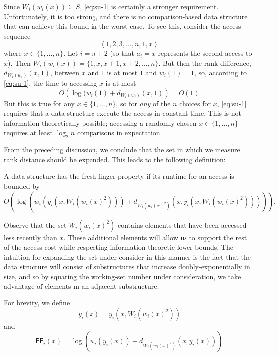 \documentclass{llncs}
\newcommand{\BigOh}[1]{O\!\left(#1\right)}
\newcommand{\SU}[1]{\textsf{FF}_i\!\left(#1\right)}
\begin{document}
Since $W_i(w_i(x))\subseteq S$, \eqref{eq:su-1} is certainly a stronger requirement.  Unfortunately, it is too strong, and there is no comparison-based data structure that can achieve this bound in the worst-case. To see this, consider the access sequence
\begin{displaymath}
	\left\langle 1,2,3,\ldots,n,1,x \right\rangle
\end{displaymath}
where $x \in \{1,\ldots,n\}$.  Let $i={n+2}$ (so that $a_i =x$ represents the second access to $x$).  Then $W_i(w_i(x)) = \{1,x,x+1,x+2,\ldots,n\}$.  But then the rank difference, $d_{W_i(w_i)}(x,1)$, between $x$ and $1$ is at most 1 and $w_i(1)=1$, so, according to \eqref{eq:su-1}, the time to accessing $x$ is at most\[
   \BigOh{\log(w_i(1)+d_{W_i(w_i)}(x,1)} = \BigOh{1}
\]
But this is true for any $x\in\{1,\ldots,n\}$, so for \emph{any} of the $n$ choices for $x$, \eqref{eq:su-1} requires that a data structure execute the access in constant time. This is not information-theoretically possible; accessing a randomly chosen $x\in\{1,\ldots,n\}$ requires at least $\log_2 n$ comparisons in expectation.  

From the preceding discussion, we conclude that the set in which we measure rank distance should be expanded.  This leads to the following definition:

\begin{definition} A data structure has the fresh-finger property if its runtime for an access is bounded by
\begin{displaymath}
	\BigOh{\log (w_i(y_i(x,W_i(w_i(x)^2))) + d_{W_i(w_i(x)^2)}(x,y_i(x,W_i(w_i(x)^2))))}.
\end{displaymath}
\end{definition}

Observe that the set $W_i(w_i(x)^2)$ contains elements that have been accessed less recently than $x$. These additional elements will allow us to support the rest of the access cost while respecting information-theoretic lower bounds. The intuition for expanding the set under consider in this manner is the fact that the data structure will consist of substructures that increase doubly-exponentially in size, and so by squaring the working-set number under consideration, we take advantage of elements in an adjacent substructure.

For brevity, we define
\begin{displaymath}
	y_i(x) = y_i(x,W_i(w_i(x)^2))
\end{displaymath}
and
\begin{displaymath}
	\SU{x} = \log (w_i(y_i(x)) + d_{W_i(w_i(x)^2)}(x,y_i(x)))
\end{displaymath}
\end{document}
